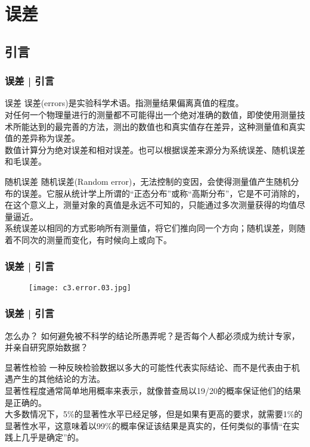 \section{误差}
\subsection{引言}
\begin{frame}
  \frametitle{误差 | 引言}
  \begin{block}{误差}
    误差(errors)是实验科学术语。指测量结果偏离真值的程度。\\
    \vspace{0.3em}
对任何一个物理量进行的测量都不可能得出一个绝对准确的数值，即使使用测量技术所能达到的最完善的方法，测出的数值也和真实值存在差异，这种测量值和真实值的差异称为误差。\\
\vspace{0.3em}
数值计算分为绝对误差和相对误差。也可以根据误差来源分为系统误差、随机误差和毛误差。
  \end{block}
  \pause
  \begin{block}{随机误差}
    随机误差(Random error)，无法控制的变因，会使得测量值产生随机分布的误差。它服从统计学上所谓的“正态分布”或称“高斯分布”，它是不可消除的，在这个意义上，\alert{测量对象的真值是永远不可知的，只能通过多次测量获得的均值尽量逼近}。\\
    \vspace{0.3em}
    系统误差以相同的方式影响所有测量值，将它们推向同一个方向；随机误差，则随着不同次的测量而变化，有时候向上或向下。
  \end{block}
\end{frame}

\begin{frame}
  \frametitle{误差 | 引言}
  \begin{figure}
    \centering
    \texttt{[image: c3.error.03.jpg]}
  \end{figure}
\end{frame}

\begin{frame}
  \frametitle{误差 | 引言}
  \begin{block}{怎么办？}
    如何避免被不科学的结论所愚弄呢？是否每个人都必须成为统计专家，并亲自研究原始数据？
  \end{block}
  \pause
  \begin{block}{显著性检验}
    一种反映检验数据以多大的可能性代表实际结论、而不是代表由于机遇产生的其他结论的方法。\\
    \vspace{0.3em}
    显著性程度通常简单地用概率来表示，就像普查局以19/20的概率保证他们的结果是正确的。\\
    \vspace{0.3em}
大多数情况下，5\%的显著性水平已经足够，但是如果有更高的要求，就需要1\%的显著性水平，这意味着以99\%的概率保证该结果是真实的，任何类似的事情“在实践上几乎是确定”的。
  \end{block}
\end{frame}

